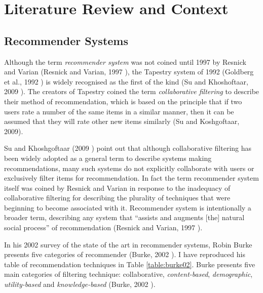 \iffalse
Chapter 2: Literature Review and Context - the setting of the project in the context of other relevant work or theories or results. How this setting influenced the project.
\fi

\section{Literature Review and Context}\label{literature review}

\subsection{Recommender Systems}

Although the term \textit{recommender system} was not coined until 1997 by Resnick and Varian (Resnick and Varian, 1997 \cite{Resnick97}), the Tapestry system of 1992 (Goldberg et al., 1992 \cite{Goldberg92}) is widely recognised as the first of the kind (Su and Khoshoftaar, 2009 \cite{Su09}). The creators of Tapestry coined the term \textit{collaborative filtering} to describe their method of recommendation, which is based on the principle that if two users rate a number of the same items in a similar manner, then it can be assumed that they will rate other new items similarly (Su and Koshgoftaar, 2009\cite{Su09}).

Su and Khoshgoftaar (2009 \cite{Su09}) point out that although collaborative filtering has been widely adopted as a general term to describe systems making recommendations, many such systems do not explicitly collaborate with users or exclusively filter items for recommendation. In fact the term recommender system itself was coined by Resnick and Varian in response to the inadequacy of collaborative filtering for describing the plurality of techniques that were beginning to become associated with it. Recommender system is intentionally a broader term, describing any system that ``assists and augments [the] natural social process'' of recommendation (Resnick and Varian, 1997 \cite{Resnick97}).

In his 2002 survey of the state of the art in recommender systems, Robin Burke presents five categories of recommender (Burke, 2002 \cite{Burke02}). I have reproduced his table of recommendation techniques in Table \ref{table:burke02}. Burke presents five main categories of filtering technique: collaborative, \textit{content-based}, \textit{demographic}, \textit{utility-based} and \textit{knowledge-based} (Burke, 2002 \cite{Burke02}).

